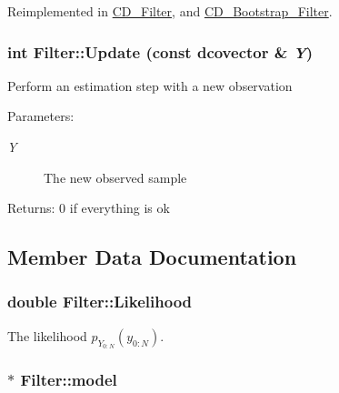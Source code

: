 Reimplemented in \hyperlink{class_c_d___filter_b304de0cc156193c9e938188c1092188}{CD\_\-Filter}, and \hyperlink{class_c_d___bootstrap___filter_eb203b8cdeb51133a232dce5763ed153}{CD\_\-Bootstrap\_\-Filter}.\hypertarget{class_filter_75ba779211698e81a2334a568dcba76e}{
\subsubsection[{Update}]{\setlength{\rightskip}{0pt plus 5cm}int Filter::Update (const dcovector \& {\em Y})}}
\label{class_filter_75ba779211698e81a2334a568dcba76e}


Perform an estimation step with a new observation

\begin{Desc}
\item[Parameters:]
\begin{description}
\item[{\em Y}]The new observed sample\end{description}
\end{Desc}
\begin{Desc}
\item[Returns:]0 if everything is ok \end{Desc}


\subsection{Member Data Documentation}
\hypertarget{class_filter_5d4fd0aac4fddb732fc42e680fab5a1f}{
\subsubsection[{Likelihood}]{\setlength{\rightskip}{0pt plus 5cm}double {\bf Filter::Likelihood}}}
\label{class_filter_5d4fd0aac4fddb732fc42e680fab5a1f}


The likelihood $ p_{Y_{0:N}}(y_{0:N}) $. 

\hypertarget{class_filter_2173d25727b871e9b9d0b6f588ba3cd2}{
\subsubsection[{model}]{$\ast$ {\bf Filter::model}}}
\label{class_filter_2173d25727b871e9b9d0b6f588ba3cd2}


